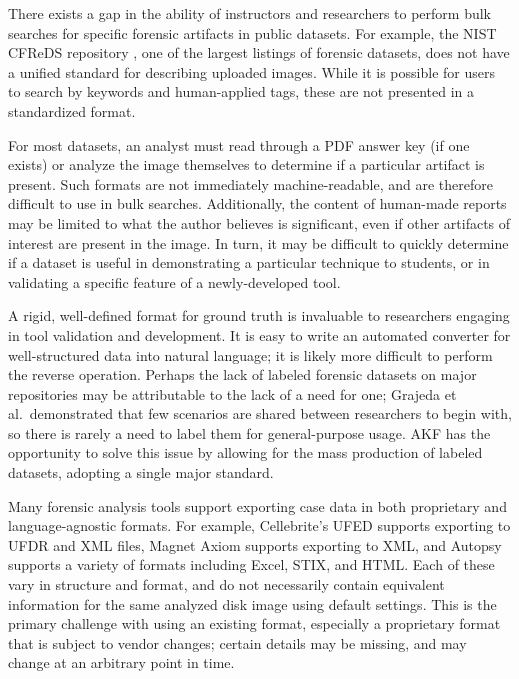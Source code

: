 There exists a gap in the ability of instructors and researchers to
perform bulk searches for specific forensic artifacts in public
datasets. For example, the NIST CFReDS repository
\cite{nationalinstituteofstandardsandtechnologyCFReDSPortal}, one of
the largest listings of forensic datasets, does not have a unified
standard for describing uploaded images. While it is possible for users
to search by keywords and human-applied tags, these are not presented in
a standardized format.

For most datasets, an analyst must read through a PDF answer key (if one
exists) or analyze the image themselves to determine if a particular
artifact is present. Such formats are not immediately machine-readable,
and are therefore difficult to use in bulk searches. Additionally, the
content of human-made reports may be limited to what the author believes
is significant, even if other artifacts of interest are present in the
image. In turn, it may be difficult to quickly determine if a dataset is
useful in demonstrating a particular technique to students, or in
validating a specific feature of a newly-developed tool.

A rigid, well-defined format for ground truth is invaluable to
researchers engaging in tool validation and development. It is easy to
write an automated converter for well-structured data into natural
language; it is likely more difficult to perform the reverse operation.
Perhaps the lack of labeled forensic datasets on major repositories may
be attributable to the lack of a need for one; Grajeda et
al.~demonstrated that few scenarios are shared between researchers to
begin with, so there is rarely a need to label them for general-purpose
usage. AKF has the opportunity to solve this issue by allowing for the
mass production of labeled datasets, adopting a single major standard.

Many forensic analysis tools support exporting case data in both
proprietary and language-agnostic formats. For example, Cellebrite's
UFED supports exporting to UFDR and XML files, Magnet Axiom supports
exporting to XML, and Autopsy supports a variety of formats including
Excel, STIX, and HTML. Each of these vary in structure and format, and
do not necessarily contain equivalent information for the same analyzed
disk image using default settings. This is the primary challenge with
using an existing format, especially a proprietary format that is
subject to vendor changes; certain details may be missing, and may
change at an arbitrary point in time.

